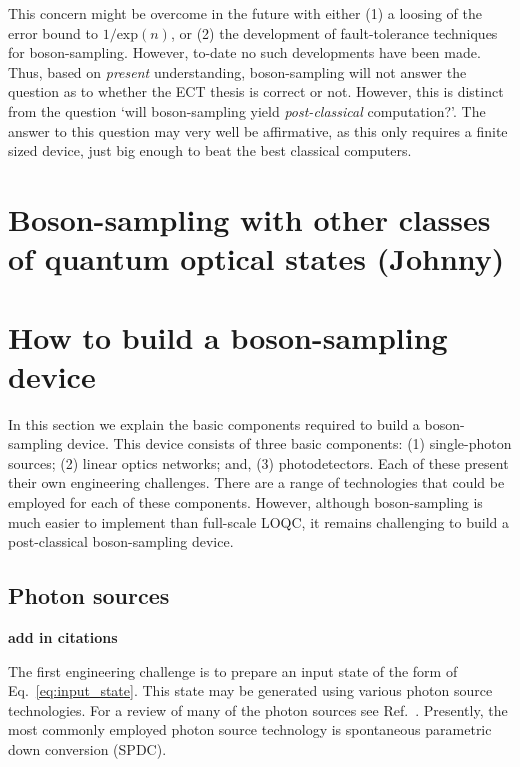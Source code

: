 \documentclass[aps,pra,twocolumn,amsmath,amssymb,nofootinbib,superscriptaddress]{revtex4}
\begin{document}
This concern might be overcome in the future with either (1) a loosing of the error bound to $1/\mathrm{exp}(n)$, or (2) the development of fault-tolerance techniques for boson-sampling. However, to-date no such developments have been made. Thus, based on \emph{present} understanding, boson-sampling will not answer the question as to whether the ECT thesis is correct or not. However, this is distinct from the question `will boson-sampling yield \emph{post-classical} computation?'. The answer to this question may very well be affirmative, as this only requires a finite sized device, just big enough to beat the best classical computers.

\section{Boson-sampling with other classes of quantum optical states (Johnny)}

\section{How to build a boson-sampling device}

In this section we explain the basic components required to build a boson-sampling device. This device consists of three basic components: (1) single-photon sources; (2) linear optics networks; and, (3) photodetectors. Each of these present their own engineering challenges. There are a range of technologies that could be employed for each of these components. However, although boson-sampling is much easier to implement than full-scale LOQC, it remains challenging to build a post-classical boson-sampling device. 

\subsection{Photon sources}

\textbf{add in citations}

The first engineering challenge is to prepare an input state of the form of Eq.~\ref{eq:input_state}. This state may be generated using various photon source technologies. For a review of many of the photon sources see Ref.~\cite{bib:SourceAndDetectorReview}. Presently, the most commonly employed photon source technology is spontaneous parametric down conversion (SPDC).
\end{document}
